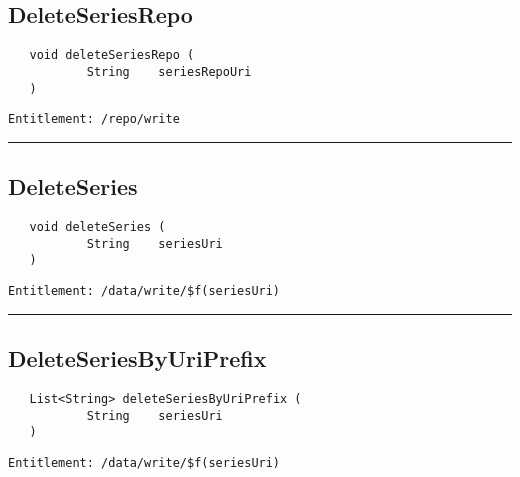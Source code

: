 \subsection{DeleteSeriesRepo}
\label{Api:DeleteSeriesRepo}
\begin{Verbatim}
   void deleteSeriesRepo (
           String    seriesRepoUri
   )
\end{Verbatim}
\begin{Verbatim}[formatcom=\color{Maroon}]
  Entitlement: /repo/write
\end{Verbatim}



\rule{12cm}{2pt}
\subsection{DeleteSeries}
\label{Api:DeleteSeries}
\begin{Verbatim}
   void deleteSeries (
           String    seriesUri
   )
\end{Verbatim}
\begin{Verbatim}[formatcom=\color{Maroon}]
  Entitlement: /data/write/$f(seriesUri)
\end{Verbatim}



\rule{12cm}{2pt}
\subsection{DeleteSeriesByUriPrefix}
\label{Api:DeleteSeriesByUriPrefix}
\begin{Verbatim}
   List<String> deleteSeriesByUriPrefix (
           String    seriesUri
   )
\end{Verbatim}
\begin{Verbatim}[formatcom=\color{Maroon}]
  Entitlement: /data/write/$f(seriesUri)
\end{Verbatim}



